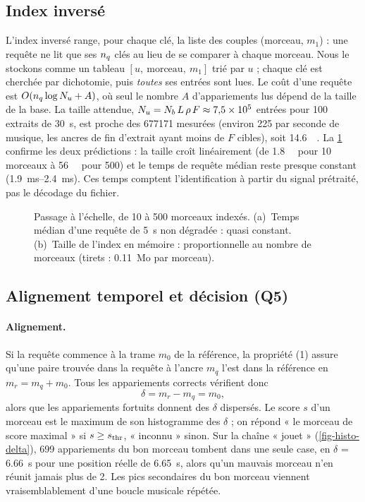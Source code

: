 \subsection{Index inversé}
\label{sec-index}

L'index inversé range, pour chaque clé, la liste des couples (morceau, $m_1$) : une requête
ne lit que ses $n_q$ clés au lieu de se comparer à chaque morceau. Nous le stockons comme un
tableau $[u,\ \text{morceau},\ m_1]$ trié par $u$ ; chaque clé est cherchée par dichotomie,
puis \emph{toutes} ses entrées sont lues. Le coût d'une requête est
$O(n_q \log N_u + A)$, où seul le nombre $A$ d'appariements lus dépend de la taille de la
base. La taille attendue, $N_u = N_b\,L\,\rho\,F \approx \num{7.5e5}$ entrées pour 100
extraits de \qty{30}{\second}, est proche des \num{677171} mesurées (environ 225 par seconde
de musique, les ancres de fin d'extrait ayant moins de $F$ cibles), soit
\qty{14.6}{\mega\byte}. La \cref{fig-passage-echelle} confirme les deux prédictions : la taille
croît linéairement (de \qty{1.8}{\mega\byte} pour 10 morceaux à \qty{56}{\mega\byte} pour 500)
et le temps de requête médian reste presque constant (\qtyrange{1.9}{2.4}{\milli\second}). Ces temps comptent l'identification à partir du signal prétraité, pas le décodage du
fichier.

\begin{figure}[t]
  \centering
  \caption{Passage à l'échelle, de 10 à 500 morceaux indexés. (a)~Temps médian d'une
  requête de \qty{5}{\second} non dégradée : quasi constant. (b)~Taille de l'index en
  mémoire : proportionnelle au nombre de morceaux (tirets : \qty{0.11}{Mo} par morceau).}
  \label{fig-passage-echelle}
\end{figure}

\subsection{Alignement temporel et décision (Q5)}
\label{sec-decision}

\paragraph{Alignement.} Si la requête commence à la trame $m_0$ de la référence, la
propriété (1) assure qu'une paire trouvée dans la requête à l'ancre $m_q$ l'est dans la
référence en $m_r = m_q + m_0$. Tous les appariements corrects vérifient donc
\begin{equation}
  \delta = m_r - m_q = m_0 ,
  \tag{7}
\end{equation}
alors que les appariements fortuits donnent des $\delta$ dispersés. Le score $s$ d'un
morceau est le maximum de son histogramme des $\delta$ ; on répond « le morceau de score
maximal » si $s \ge s_{\mathrm{thr}}$, « inconnu » sinon. Sur la chaîne « jouet »
(\cref{fig-histo-delta}), 699 appariements du bon morceau tombent dans une seule case, en
$\delta$ = \qty{6.66}{\second} pour une position réelle de \qty{6.65}{\second}, alors qu'un
mauvais morceau n'en réunit jamais plus de 2. Les pics secondaires du bon morceau viennent
vraisemblablement d'une boucle musicale répétée.

